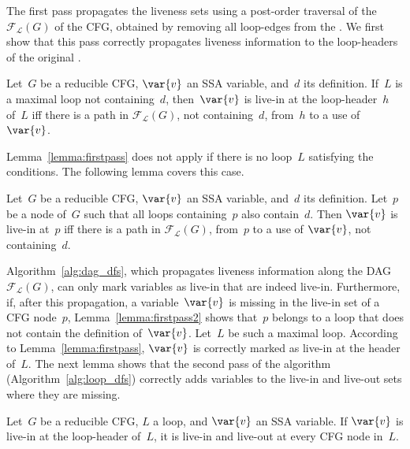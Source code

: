 

The first pass propagates the liveness sets using a post-order traversal of the \reducedGraph\ $\mathcal{F}_\mathcal{L}(G)$ of the CFG, obtained by removing all loop-edges from the \@CFG.
We first show that this pass correctly propagates liveness information to the loop-headers of the original \@CFG.
\begin{lemma}
	\label{lemma:firstpass}
	Let~$G$ be a reducible CFG, $\var{v}$ an SSA variable, and~$d$ its definition.
	If~$L$ is a maximal loop not containing~$d$, then~$\var{v}$ is live-in at the loop-header~$h$ of~$L$ iff there is a path in $\mathcal{F}_\mathcal{L}(G)$, not containing~$d$, from~$h$ to a use of $\var{v}$.
\end{lemma}


Lemma~\ref{lemma:firstpass} does not apply if there is no loop~$L$ satisfying the conditions.
The following lemma covers this case.

\begin{lemma}
	\label{lemma:firstpass2}
	Let~$G$ be a reducible CFG, $\var{v}$ an SSA variable, and~$d$ its definition.
	Let~$p$ be a node of~$G$ such that all loops containing~$p$ also contain~$d$.
	Then $\var{v}$ is live-in at~$p$ iff there is a path in $\mathcal{F}_\mathcal{L}(G)$, from~$p$ to a use of $\var{v}$, not containing~$d$.
\end{lemma}


Algorithm~\ref{alg:dag_dfs}, which propagates liveness information along the DAG $\mathcal{F}_\mathcal{L}(G)$, can only mark variables as live-in that are indeed live-in.
Furthermore, if, after this propagation, a variable~$\var{v}$ is missing in the live-in set of a CFG node~$p$, Lemma~\ref{lemma:firstpass2} shows that~$p$ belongs to a loop that does not contain the definition of~$\var{v}$.
Let~$L$ be such a maximal loop.
According to Lemma~\ref{lemma:firstpass}, $\var{v}$ is correctly marked as live-in at the header of~$L$.
The next lemma shows that the second pass of the algorithm (Algorithm~\ref{alg:loop_dfs}) correctly adds variables to the live-in and live-out sets where they are missing.

\begin{lemma}
	\label{lemma:secondpass}
	Let~$G$ be a reducible CFG, $L$ a loop, and $\var{v}$ an SSA variable.
	If $\var{v}$ is live-in at the loop-header of~$L$, it is live-in and live-out at every CFG node in~$L$.
\end{lemma}


